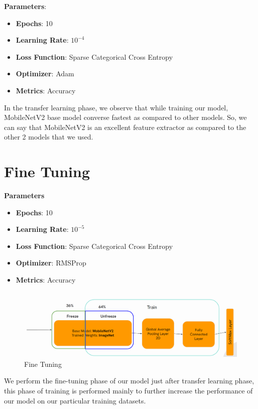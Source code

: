 \textbf{Parameters}:\par
\begin{itemize}
    \item \textbf{Epochs}: 10\par
    \item \textbf{Learning Rate}: $10^{-4}$\par
    \item \textbf{Loss Function}: Sparse Categorical Cross Entropy\par
    \item \textbf{Optimizer}: Adam\par
    \item \textbf{Metrics}: Accuracy
\end{itemize}


In the transfer learning phase, we observe that while training our model, MobileNetV2 base model converse fastest as compared to other models. So, we can say that MobileNetV2 is an excellent feature extractor as compared to the other 2 models that we used.


\section{Fine Tuning}
\textbf{Parameters}
\begin{itemize}
    \item \textbf{Epochs}: 10
    \item \textbf{Learning Rate}: $10^{-5}$
    \item \textbf{Loss Function}: Sparse Categorical Cross Entropy
    \item \textbf{Optimizer}: RMSProp
    \item \textbf{Metrics}: Accuracy
\end{itemize}


\begin{figure}
    \centering
    \includegraphics[width=1\linewidth]{graphics//chapter5/fine tuning.png}
    \caption{Fine Tuning}
    \label{fig:fine-tuning}
\end{figure}

We perform the fine-tuning phase of our model just after transfer learning phase, this phase of training is performed mainly to further increase the performance of our model on our particular training datasets.\\


